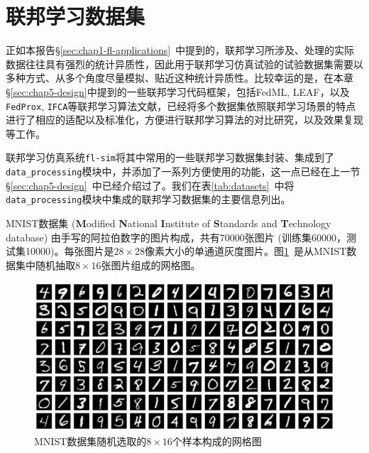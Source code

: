 \section{联邦学习数据集}
\label{sec:chap5-datasets}


正如本报告\S\ref{sec:chap1-fl-applications}~中提到的，联邦学习所涉及、处理的实际数据往往具有强烈的统计异质性，因此用于联邦学习仿真试验的试验数据集需要以多种方式、从多个角度尽量模拟、贴近这种统计异质性。比较幸运的是，在本章\S\ref{sec:chap5-design}中提到的一些联邦学习代码框架，包括FedML\cite{he_2020_fedml}, LEAF\cite{caldas2018_leaf}，以及\texttt{FedProx}\cite{sahu2018fedprox}, \texttt{IFCA}\cite{Ghosh_2022_cfl}等联邦学习算法文献，已经将多个数据集依照联邦学习场景的特点进行了相应的适配以及标准化，方便进行联邦学习算法的对比研究，以及效果复现等工作。

联邦学习仿真系统\texttt{fl-sim}将其中常用的一些联邦学习数据集封装、集成到了\texttt{data\_processing}模块中，并添加了一系列方便使用的功能，这一点已经在上一节\S\ref{sec:chap5-design}~中已经介绍过了。我们在表\ref{tab:datasets}~中将\texttt{data\_processing}模块中集成的联邦学习数据集的主要信息列出。



MNIST数据集 (\textbf{M}odified \textbf{N}ational \textbf{I}nstitute of \textbf{S}tandards and \textbf{T}echnology database) \cite{Lecun_1998_mnist}由手写的阿拉伯数字的图片构成，共有70000张图片 (训练集60000，测试集10000)。每张图片是$28\times 28$像素大小的单通道灰度图片。图\ref{fig:mnist_random_grid_view}~是从MNIST数据集中随机抽取$8\times 16$张图片组成的网格图。

\begin{figure}[ht]
\centering
\includegraphics[width=\textwidth]{figures/mnist_random_grid_view.pdf}
\caption{MNIST数据集随机选取的$8\times 16$个样本构成的网格图}
\label{fig:mnist_random_grid_view}
\end{figure}

